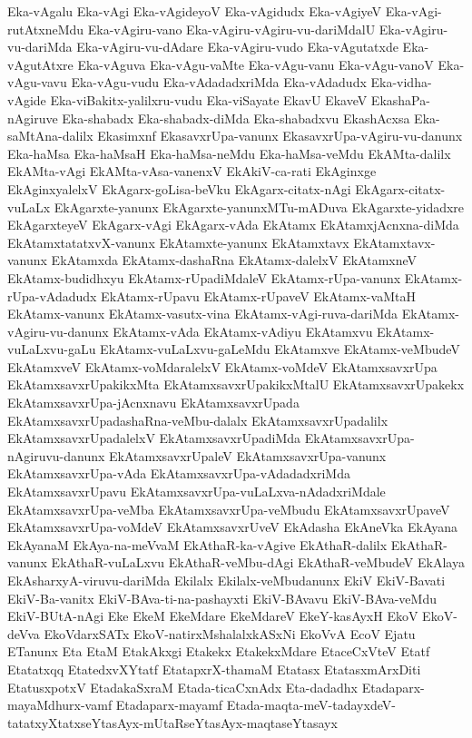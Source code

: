 {Eka-vAgalu
Eka-vAgi
Eka-vAgideyoV
Eka-vAgidudx
Eka-vAgiyeV
Eka-vAgi-rutAtxneMdu
Eka-vAgiru-vano
Eka-vAgiru-vAgiru-vu-dariMdalU
Eka-vAgiru-vu-dariMda
Eka-vAgiru-vu-dAdare
Eka-vAgiru-vudo
Eka-vAgutatxde
Eka-vAgutAtxre
Eka-vAguva
Eka-vAgu-vaMte
Eka-vAgu-vanu
Eka-vAgu-vanoV
Eka-vAgu-vavu
Eka-vAgu-vudu
Eka-vAdadadxriMda
Eka-vAdadudx
Eka-vidha-vAgide
Eka-viBakitx-yalilxru-vudu
Eka-viSayate
EkavU
EkaveV
EkashaPa-nAgiruve
Eka-shabadx
Eka-shabadx-diMda
Eka-shabadxvu
EkashAcxsa
Eka-saMtAna-dalilx
Ekasimxnf
EkasavxrUpa-vanunx
EkasavxrUpa-vAgiru-vu-danunx
Eka-haMsa
Eka-haMsaH
Eka-haMsa-neMdu
Eka-haMsa-veMdu
EkAMta-dalilx
EkAMta-vAgi
EkAMta-vAsa-vanenxV
EkAkiV-ca-rati
EkAginxge
EkAginxyalelxV
EkAgarx-goLisa-beVku
EkAgarx-citatx-nAgi
EkAgarx-citatx-vuLaLx
EkAgarxte-yanunx
EkAgarxte-yanunxMTu-mADuva
EkAgarxte-yidadxre
EkAgarxteyeV
EkAgarx-vAgi
EkAgarx-vAda
EkAtamx
EkAtamxjAcnxna-diMda
EkAtamxtatatxvX-vanunx
EkAtamxte-yanunx
EkAtamxtavx
EkAtamxtavx-vanunx
EkAtamxda
EkAtamx-dashaRna
EkAtamx-dalelxV
EkAtamxneV
EkAtamx-budidhxyu
EkAtamx-rUpadiMdaleV
EkAtamx-rUpa-vanunx
EkAtamx-rUpa-vAdadudx
EkAtamx-rUpavu
EkAtamx-rUpaveV
EkAtamx-vaMtaH
EkAtamx-vanunx
EkAtamx-vasutx-vina
EkAtamx-vAgi-ruva-dariMda
EkAtamx-vAgiru-vu-danunx
EkAtamx-vAda
EkAtamx-vAdiyu
EkAtamxvu
EkAtamx-vuLaLxvu-gaLu
EkAtamx-vuLaLxvu-gaLeMdu
EkAtamxve
EkAtamx-veMbudeV
EkAtamxveV
EkAtamx-voMdaralelxV
EkAtamx-voMdeV
EkAtamxsavxrUpa
EkAtamxsavxrUpakikxMta
EkAtamxsavxrUpakikxMtalU
EkAtamxsavxrUpakekx
EkAtamxsavxrUpa-jAcnxnavu
EkAtamxsavxrUpada
EkAtamxsavxrUpadashaRna-veMbu-dalalx
EkAtamxsavxrUpadalilx
EkAtamxsavxrUpadalelxV
EkAtamxsavxrUpadiMda
EkAtamxsavxrUpa-nAgiruvu-danunx
EkAtamxsavxrUpaleV
EkAtamxsavxrUpa-vanunx
EkAtamxsavxrUpa-vAda
EkAtamxsavxrUpa-vAdadadxriMda
EkAtamxsavxrUpavu
EkAtamxsavxrUpa-vuLaLxva-nAdadxriMdale
EkAtamxsavxrUpa-veMba
EkAtamxsavxrUpa-veMbudu
EkAtamxsavxrUpaveV
EkAtamxsavxrUpa-voMdeV
EkAtamxsavxrUveV
EkAdasha
EkAneVka
EkAyana
EkAyanaM
EkAya-na-meVvaM
EkAthaR-ka-vAgive
EkAthaR-dalilx
EkAthaR-vanunx
EkAthaR-vuLaLxvu
EkAthaR-veMbu-dAgi
EkAthaR-veMbudeV
EkAlaya
EkAsharxyA-viruvu-dariMda
Ekilalx
Ekilalx-veMbudanunx
EkiV
EkiV-Bavati
EkiV-Ba-vanitx
EkiV-BAva-ti-na-pashayxti
EkiV-BAvavu
EkiV-BAva-veMdu
EkiV-BUtA-nAgi
Eke
EkeM
EkeMdare
EkeMdareV
EkeY-kasAyxH
EkoV
EkoV-deVva
EkoVdarxSATx
EkoV-natirxMshalalxkASxNi
EkoVvA
EcoV
Ejatu
ETanunx
Eta
EtaM
EtakAkxgi
Etakekx
EtakekxMdare
EtaceCxVteV
Etatf
Etatatxqq
EtatedxvXYtatf
EtatapxrX-thamaM
Etatasx
EtatasxmArxDiti
EtatusxpotxV
EtadakaSxraM
Etada-ticaCxnAdx
Eta-dadadhx
Etadaparx-mayaMdhurx-vamf
Etadaparx-mayamf
Etada-maqta-meV-tadayxdeV-tatatxyXtatxseYtasAyx-mUtaRseYtasAyx-maqtaseYtasayx
}
